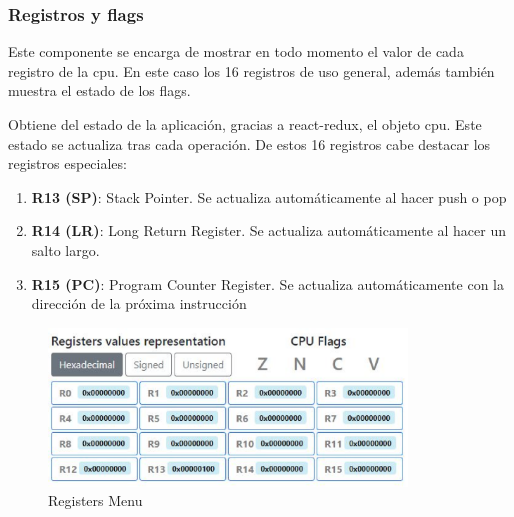 {        \subsubsection{Registros y flags}
        {
            Este componente se encarga de mostrar en todo momento el valor de cada registro de la cpu.
            En este caso los 16 registros de uso general, además también muestra el estado de los flags.

            Obtiene del estado de la aplicación, gracias a react-redux, el objeto cpu. Este estado se actualiza tras cada operación. De estos 16 registros cabe destacar
            los registros especiales: 


            \begin{enumerate}
                \item \textbf{R13 (SP)}: Stack Pointer. Se actualiza automáticamente al hacer push o pop
                \item \textbf{R14 (LR)}: Long Return Register. Se actualiza automáticamente al hacer un salto largo.
                \item \textbf{R15 (PC)}: Program Counter Register. Se actualiza automáticamente con la dirección de la próxima instrucción
            \end{enumerate}
            \clearpage

            \begin{figure}[h]
                \centering
                \includegraphics[width=0.85\textwidth]{images/registers}
                \caption{Registers Menu}
            \end{figure}

}}
